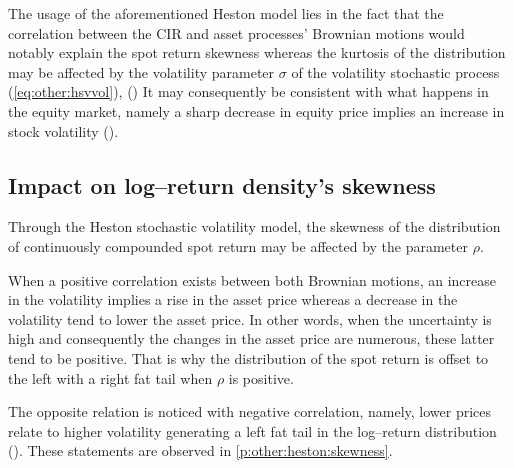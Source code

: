 \documentclass[a4paper, 12pt]{report}
\begin{document}
The usage of the aforementioned Heston model lies in the fact that the correlation between the CIR and asset processes' Brownian motions would notably explain the spot return skewness whereas the kurtosis of the distribution may be affected by the volatility parameter $\sigma$ of the volatility stochastic process (\cref{eq:other:hsvvol}), (\citet{heston1993})
It may consequently be consistent with what happens in the equity market, namely a sharp decrease in equity price implies an increase in stock volatility (\citet{criso2015}).




\subsection{Impact on log--return density's skewness}
\label{sub:hestonskewness}

Through the Heston stochastic volatility model, the skewness of the distribution of continuously compounded spot return may be affected by the parameter $\rho$. 

When a positive correlation exists between both Brownian motions, an increase in the volatility implies a rise in the asset price whereas a decrease in the volatility tend to lower the asset price.
In other words, when the uncertainty is high and consequently the changes in the asset price are numerous, these latter tend to be positive. 
That is why the distribution of the spot return is offset to the left with a right fat tail when $\rho$ is positive.

The opposite relation is noticed with negative correlation, namely, lower prices relate to higher volatility generating a left fat tail in the log–return distribution (\citet{heston1993}).
These statements are observed in \cref{p:other:heston:skewness}.
\end{document}
